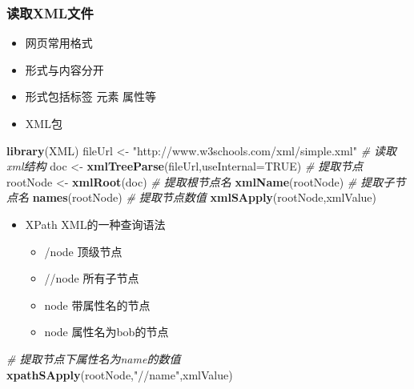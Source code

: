 \documentclass[]{book}
\newenvironment{Shaded}{\begin{snugshade}}{\end{snugshade}}
\newcommand{\CommentTok}[1]{\textcolor[rgb]{0.56,0.35,0.01}{\textit{#1}}}
\newcommand{\DataTypeTok}[1]{\textcolor[rgb]{0.13,0.29,0.53}{#1}}
\newcommand{\KeywordTok}[1]{\textcolor[rgb]{0.13,0.29,0.53}{\textbf{#1}}}
\newcommand{\NormalTok}[1]{#1}
\newcommand{\OtherTok}[1]{\textcolor[rgb]{0.56,0.35,0.01}{#1}}
\newcommand{\StringTok}[1]{\textcolor[rgb]{0.31,0.60,0.02}{#1}}
\providecommand{\tightlist}{%
  \setlength{\itemsep}{0pt}\setlength{\parskip}{0pt}}
\begin{document}
\hypertarget{xml}{%
\subsubsection{读取XML文件}\label{xml}}

\begin{itemize}
\tightlist
\item
  网页常用格式
\item
  形式与内容分开
\item
  形式包括标签 元素 属性等
\item
  XML包
\end{itemize}

\begin{Shaded}
\begin{Highlighting}[]
\KeywordTok{library}\NormalTok{(XML)}
\NormalTok{fileUrl <-}\StringTok{ "http://www.w3schools.com/xml/simple.xml"}
\CommentTok{# 读取xml结构}
\NormalTok{doc <-}\StringTok{ }\KeywordTok{xmlTreeParse}\NormalTok{(fileUrl,}\DataTypeTok{useInternal=}\OtherTok{TRUE}\NormalTok{)}
\CommentTok{# 提取节点}
\NormalTok{rootNode <-}\StringTok{ }\KeywordTok{xmlRoot}\NormalTok{(doc)}
\CommentTok{# 提取根节点名}
\KeywordTok{xmlName}\NormalTok{(rootNode)}
\CommentTok{# 提取子节点名}
\KeywordTok{names}\NormalTok{(rootNode) }
\CommentTok{# 提取节点数值}
\KeywordTok{xmlSApply}\NormalTok{(rootNode,xmlValue)}
\end{Highlighting}
\end{Shaded}

\begin{itemize}
\tightlist
\item
  XPath XML的一种查询语法

  \begin{itemize}
  \tightlist
  \item
    /node 顶级节点
  \item
    //node 所有子节点
  \item
    node\citep{attr-name} 带属性名的节点
  \item
    node\citep[=`bob']{attr-name} 属性名为bob的节点
  \end{itemize}
\end{itemize}

\begin{Shaded}
\begin{Highlighting}[]
\CommentTok{# 提取节点下属性名为name的数值}
\KeywordTok{xpathSApply}\NormalTok{(rootNode,}\StringTok{"//name"}\NormalTok{,xmlValue)}
\end{Highlighting}
\end{Shaded}
\end{document}
